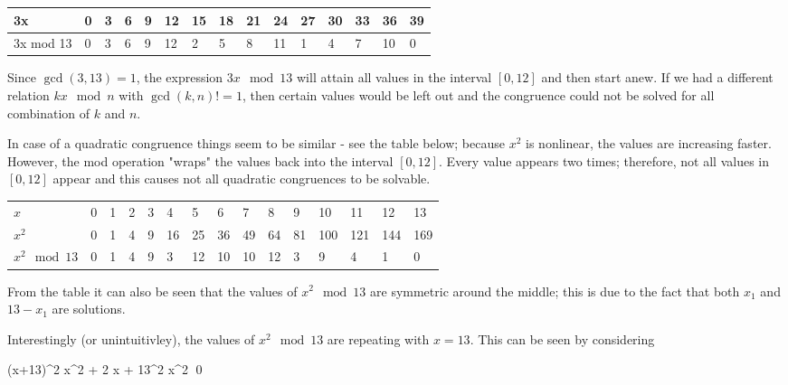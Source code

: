 \vspace{2mm}
\begin{tabular}{lllllllllllllll}
  3x        & 0 & 3 & 6 & 9 & 12 & 15 & 18 & 21 & 24 & 27 & 30 & 33 & 36 & 39 \\ \hline
  3x mod 13 & 0 & 3 & 6 & 9 & 12 & 2  & 5  & 8  & 11 & 1  & 4  & 7  & 10 & 0 
\end{tabular}
\vspace{2mm}

Since $\gcd(3,13) = 1$, the expression $3x \mod 13$ will attain all values in the interval $[0, 12]$ and then start anew. If we had a different relation $kx \mod n$ with $\gcd(k, n) != 1$, then certain values would be left out and the congruence could not be solved for all combination of $k$ and $n$.

In case of a quadratic congruence things seem to be similar - see the table below; because $x^2$ is nonlinear, the values are increasing faster. However, the mod operation "wraps" the values back into the interval $[0, 12]$. Every value appears two times; therefore, not all values in $[0, 12]$ appear and this causes not all quadratic congruences to be solvable.

\vspace{2mm}
\begin{tabular}{lllllllllllllll}
  $x$          & 0 & 1 & 2 & 3 & 4  & 5  & 6  & 7  & 8  & 9  & 10  & 11  & 12  & 13  \\
  $x^2$        & 0 & 1 & 4 & 9 & 16 & 25 & 36 & 49 & 64 & 81 & 100 & 121 & 144 & 169 \\ \hline
  $x^2 \mod 13$& 0 & 1 & 4 & 9 & 3  & 12 & 10 & 10 & 12 & 3  & 9   & 4   & 1   & 0  
\end{tabular}
\vspace{2mm}

From the table it can also be seen that the values of $x^2 \mod 13$ are symmetric around the middle; this is due to the fact that both $x_1$ and $13 - x_1$ are solutions.

Interestingly (or unintuitivley), the values of $x^2 \mod 13$ are repeating with $x=13$. This can be seen by considering

\bee
(x+13)^2 \equiv x^2 + 2  \cdot x + 13^2 \equiv x^2  \qed
\eee




